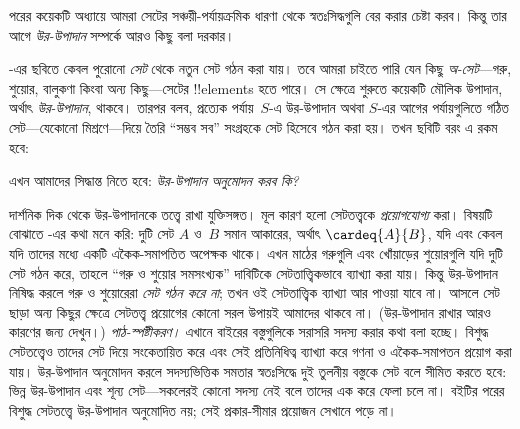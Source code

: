 \documentclass[../../../include/open-logic-section]{subfiles}
\begin{document}

পরের কয়েকটি অধ্যায়ে আমরা সেটের সঞ্চয়ী-পর্যায়ক্রমিক ধারণা থেকে
স্বতঃসিদ্ধগুলি বের করার চেষ্টা করব। কিন্তু তার আগে
\emph{উর-উপাদান} সম্পর্কে আরও কিছু বলা দরকার।

-এর ছবিতে কেবল পুরোনো \emph{সেট} থেকে
নতুন সেট গঠন করা যায়। তবে আমরা চাইতে পারি যেন কিছু
\emph{অ-সেট}—গরু, শুয়োর, বালুকণা কিংবা অন্য কিছু—সেটের
!!{element}s হতে পারে। সে ক্ষেত্রে শুরুতে কয়েকটি মৌলিক
উপাদান, অর্থাৎ \emph{উর-উপাদান}, থাকবে। তারপর বলব,
প্রত্যেক পর্যায়~$S$-এ উর-উপাদান অথবা $S$-এর আগের
পর্যায়গুলিতে গঠিত সেট—যেকোনো মিশ্রণে—দিয়ে তৈরি
``সম্ভব সব'' সংগ্রহকে সেট হিসেবে গঠন করা হয়। তখন ছবিটি
বরং এ রকম হবে:
\begin{center}
\end{center}
এখন আমাদের সিদ্ধান্ত নিতে হবে: \emph{উর-উপাদান অনুমোদন করব কি?}

দার্শনিক দিক থেকে উর-উপাদানকে তত্ত্বে রাখা যুক্তিসঙ্গত।
মূল কারণ হলো সেটতত্ত্বকে \emph{প্রয়োগযোগ্য} করা। বিষয়টি
বোঝাতে -এর কথা মনে করি: দুটি সেট
$A$ ও~$B$ সমান আকারের, অর্থাৎ $\cardeq{A}{B}$, যদি এবং
কেবল যদি তাদের মধ্যে একটি একৈক-সমাপতিত অপেক্ষক থাকে।
এখন মাঠের গরুগুলি এবং খোঁয়াড়ের শুয়োরগুলি যদি দুটি সেট
গঠন করে, তাহলে ``গরু ও শুয়োর সমসংখ্যক'' দাবিটিকে
সেটতাত্ত্বিকভাবে ব্যাখ্যা করা যায়। কিন্তু উর-উপাদান নিষিদ্ধ
করলে গরু ও শুয়োরেরা \emph{সেট গঠন করে না}; তখন ওই
সেটতাত্ত্বিক ব্যাখ্যা আর পাওয়া যাবে না। আসলে সেট ছাড়া
অন্য কিছুর ক্ষেত্রে সেটতত্ত্ব প্রয়োগের কোনো সরল উপায়ই
আমাদের থাকবে না। (উর-উপাদান রাখার আরও কারণের জন্য
\citealt[pp.~vi, 24, 50--1]{Potter2004} দেখুন।)
\emph{পাঠ-স্পষ্টীকরণ।} এখানে বাইরের বস্তুগুলিকে সরাসরি সদস্য
করার কথা বলা হচ্ছে। বিশুদ্ধ সেটতত্ত্বেও তাদের সেট দিয়ে সংকেতায়িত
করে এবং সেই প্রতিনিধিত্ব ব্যাখ্যা করে গণনা ও একৈক-সমাপতন
প্রয়োগ করা যায়। উর-উপাদান অনুমোদন করলে সদস্যভিত্তিক সমতার
স্বতঃসিদ্ধে দুই তুলনীয় বস্তুকে সেট বলে সীমিত করতে হবে: ভিন্ন
উর-উপাদান এবং শূন্য সেট—সকলেরই কোনো সদস্য নেই বলে তাদের
এক করে ফেলা চলে না। বইটির পরের বিশুদ্ধ সেটতত্ত্বে উর-উপাদান
অনুমোদিত নয়; সেই প্রকার-সীমার প্রয়োজন সেখানে পড়ে না।
\end{document}

